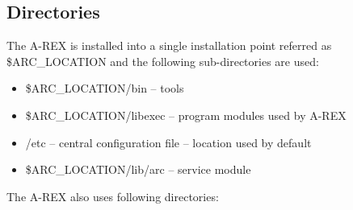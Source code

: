 \documentclass{article}                            %
\begin{document}

\subsection{Directories}

The A-REX is installed into a single installation point referred as
\$ARC\_LOCATION and the following sub-directories are used:

\begin{itemize}
\item[] \$ARC\_LOCATION/bin -- tools
\item[] \$ARC\_LOCATION/libexec -- program modules used by A-REX
\item[] /etc -- central configuration file -- location used by default
\item[] \$ARC\_LOCATION/lib/arc -- service module
\end{itemize}

The A-REX also uses following directories:
\end{document}
